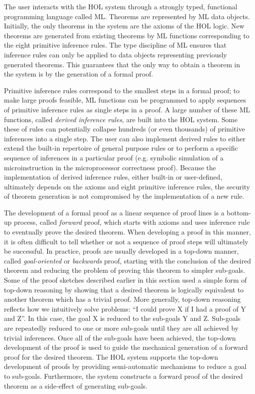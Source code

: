 \begin{normalsize}
The user interacts with the HOL system through a
strongly typed, functional programming language called ML.
Theorems are represented by ML data objects.
Initially, the only theorems in the system are the axioms of the HOL
logic.  New theorems are generated from existing theorems by
ML functions corresponding to the eight primitive inference rules.
The type discipline of ML ensures that inference rules can only
be applied to data objects representing previously generated theorems.
This guarantees that the only way to obtain a theorem in the system
is by the generation of a formal proof.

Primitive inference rules correspond to the smallest steps in a formal
proof; to make large proofs feasible,
ML functions can be programmed to
apply sequences of primitive inference rules as single steps in a proof.
A large number of these ML functions, called {\it derived inference rules},
are built into the HOL system.
Some these of rules can potentially collapse hundreds (or even thousands)
of primitive inferences into a single step.
The user can also implement derived rules to either extend the
built-in repertoire of general purpose rules or
to perform a specific sequence of inferences in a particular proof
(e.g. symbolic simulation of a microinstruction in
the microprocessor correctness proof).
Because the implementation
of derived inference rules, either built-in or user-defined,
ultimately depends on the axioms and eight primitive inference rules,
the security of theorem generation is not compromised by
the implementation of a new rule.

The development of a formal proof as a linear sequence of proof
lines is a bottom-up process, called {\it forward} proof,
which starts with axioms and uses inference
rule to eventually prove the desired theorem.
When developing a proof in this manner, it is often difficult
to tell whether or not a sequence of proof steps will ultimately
be successful.
In practice, proofs are usually developed in a top-down manner,
called {\it goal-oriented} or {\it backwards} proof,
starting with the conclusion of the desired theorem
and reducing the problem of proving this theorem to simpler
sub-goals.
Some of the proof sketches described earlier in this section used
a simple form of top-down reasoning by showing that a desired theorem
is logically equivalent to another theorem which has a trivial proof.
More generally, top-down reasoning reflects how we intuitively
solve problems:  ``I could prove X if I had a proof of Y and Z''.
In this case, the goal X is reduced to the sub-goals Y and Z.
Sub-goals are repeatedly reduced to one or more sub-goals until they are
all achieved by trivial inferences.
Once all of the sub-goals have been achieved,
the top-down development of the proof is used to guide the
mechanical generation of a forward proof for the desired theorem.
The HOL system supports the top-down development of proofs by
providing semi-automatic mechanisms to reduce a goal to sub-goals.
Furthermore, the system constructs a forward
proof of the desired theorem as a side-effect of generating sub-goals.


\end{normalsize}
